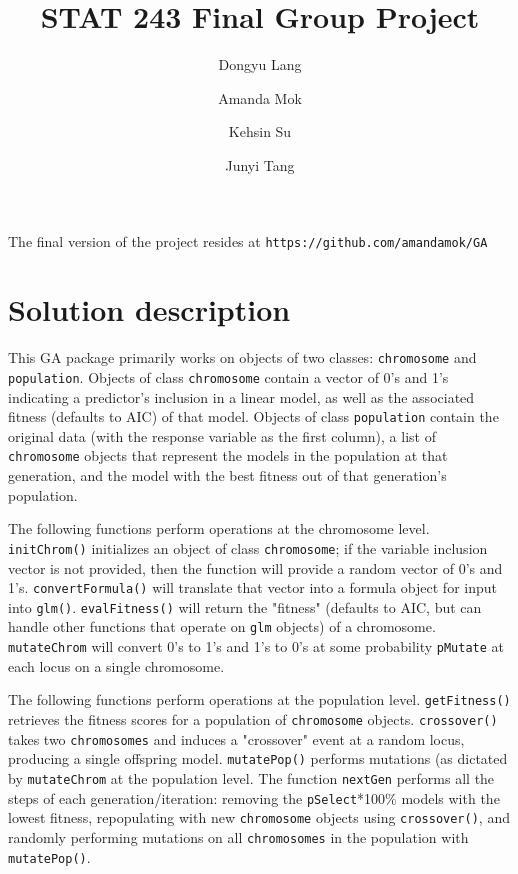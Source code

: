 \documentclass{article}\usepackage[]{graphicx}\usepackage[]{color}
\title{STAT 243 Final Group Project}
\author{
  Dongyu Lang
  \and
  Amanda Mok
  \and
  Kehsin Su
  \and
  Junyi Tang
}
\begin{document}
\maketitle

The final version of the project resides at \texttt{https://github.com/amandamok/GA}

\section{Solution description}

This GA package primarily works on objects of two classes: \texttt{chromosome} and \texttt{population}. Objects of class \texttt{chromosome} contain a vector of 0's and 1's indicating a predictor's inclusion in a linear model, as well as the associated fitness (defaults to AIC) of that model. Objects of class \texttt{population} contain the original data (with the response variable as the first column), a list of \texttt{chromosome} objects that represent the models in the population at that generation, and the model with the best fitness out of that generation's population. 

The following functions perform operations at the chromosome level. \texttt{initChrom()} initializes an object of class \texttt{chromosome}; if the variable inclusion vector is not provided, then the function will provide a random vector of 0's and 1's. \texttt{convertFormula()} will translate that vector into a formula object for input into \texttt{glm()}. \texttt{evalFitness()} will return the "fitness" (defaults to AIC, but can handle other functions that operate on \texttt{glm} objects) of a chromosome. \texttt{mutateChrom} will convert 0's to 1's and 1's to 0's at some probability \texttt{pMutate} at each locus on a single chromosome.

The following functions perform operations at the population level. \texttt{getFitness()} retrieves the fitness scores for a population of \texttt{chromosome} objects. \texttt{crossover()} takes two \texttt{chromosomes} and induces a "crossover" event at a random locus, producing a single offspring model. \texttt{mutatePop()} performs mutations (as dictated by \texttt{mutateChrom} at the population level. The function \texttt{nextGen} performs all the steps of each generation/iteration: removing the \texttt{pSelect}*100\% models with the lowest fitness, repopulating with new \texttt{chromosome} objects using \texttt{crossover()}, and randomly performing mutations on all \texttt{chromosomes} in the population with \texttt{mutatePop()}. 
\end{document}
